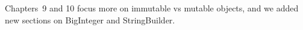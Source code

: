 Chapters~9 and 10 focus more on immutable vs mutable objects, and we added new sections on BigInteger and StringBuilder.
